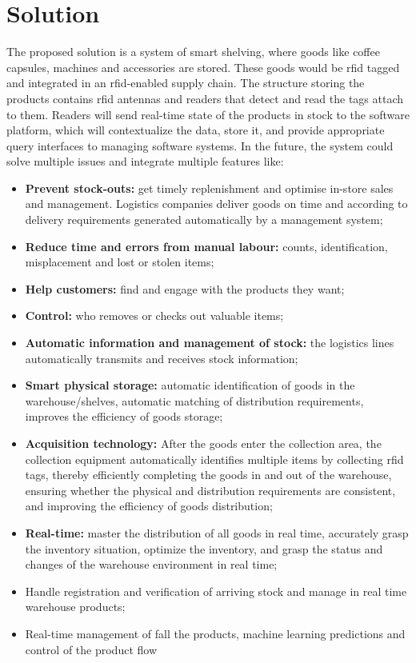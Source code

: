 \section{Solution}

The proposed solution is a system of smart shelving, where goods like coffee capsules, machines and accessories are stored. These goods would be \ac{rfid} tagged and integrated in an \ac{rfid}-enabled supply chain.
The structure storing the products contains \ac{rfid} antennas and readers that detect and read the tags attach to them. Readers will send real-time state of the products in stock to the software platform, which will contextualize the data, store it, and provide appropriate query interfaces to managing software systems.
In the future, the system could solve multiple issues and integrate multiple features like:

\begin{itemize}
    \item \textbf{Prevent stock-outs:} get timely replenishment and optimise in-store sales and management. Logistics companies deliver goods on time and according to delivery requirements generated automatically by a management system;
    \item \textbf{Reduce time and errors from manual labour:} counts, identification, misplacement and lost or stolen items;
    \item \textbf{Help customers:} find and engage with the products they want;
    \item \textbf{Control:} who removes or checks out valuable items;
    \item \textbf{Automatic information and management of stock:} the logistics lines automatically  transmits and receives stock information;
    \item \textbf{Smart physical storage:} automatic identification of goods in the warehouse/shelves, automatic matching of distribution requirements, improves the efficiency of goods storage;
    \item \textbf{Acquisition technology:} After the goods enter the collection area, the collection equipment automatically identifies multiple items by collecting \ac{rfid} tags, thereby efficiently completing the goods in and out of the warehouse, ensuring whether the physical and  distribution  requirements are consistent, and improving the efficiency of goods distribution;
    \item \textbf{Real-time:} master the distribution of all goods in real time, accurately grasp the inventory situation, optimize the inventory, and grasp the status and changes of the warehouse environment in real time;
    \item Handle registration and verification of arriving stock and manage in real time warehouse products;
    \item Real-time  management  of fall the  products, machine learning predictions and control of the product flow
\end{itemize}

